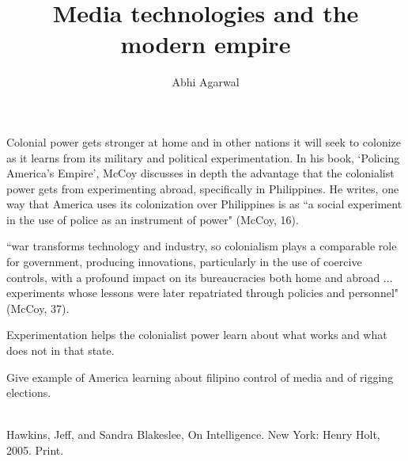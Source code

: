\documentclass[12pt, oneside]{article}
\title{Media technologies and the modern empire\vspace{-0.4cm}}
\author{Abhi Agarwal\vspace{-1cm}}
\date{}
\begin{document}
\maketitle


\par Colonial power gets stronger at home and in other nations it will seek to colonize as it learns from its military and political experimentation. In his book, `Policing America's Empire', McCoy discusses in depth the advantage that the colonialist power gets from experimenting abroad, specifically in Philippines. He writes, one way that America uses its colonization over Philippines is as ``a social experiment in the use of police as an instrument of power" (McCoy, 16). 

\par ``war transforms technology and industry, so colonialism plays a comparable role for government, producing innovations, particularly in the use of coercive controls, with a profound impact on its bureaucracies both home and abroad ... experiments whose lessons were later repatriated through policies and personnel" (McCoy, 37).

\par Experimentation helps the colonialist power learn about what works and what does not in that state.
\par Give example of America learning about filipino control of media and of rigging elections.




\noindent

\begin{workscited}
\bibent \\
\bibent Hawkins, Jeff, and Sandra Blakeslee, On Intelligence. New York: Henry Holt, 2005. Print. \\
\end{workscited}
\end{document}
